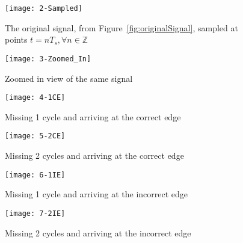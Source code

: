 \begin{figure}[ht]
\texttt{[image: 2-Sampled]}
\caption{\label{fig:sampled}The original signal, from Figure~\ref{fig:originalSignal}, sampled at points $t=nT_s , \forall n\in\mathbb{Z}$}
\end{figure}

\begin{figure}[ht]
\texttt{[image: 3-Zoomed\_In]}
\caption{\label{fig:zoom}Zoomed in view of the same signal}
\end{figure}

\begin{figure}[ht]
\texttt{[image: 4-1CE]}
\caption{\label{fig:1CE}Missing 1 cycle and arriving at the correct edge}
\end{figure}

\begin{figure}[ht]
\texttt{[image: 5-2CE]}
\caption{\label{fig:2CE}Missing 2 cycles and arriving at the correct edge}
\end{figure}

\begin{figure}[ht]
\texttt{[image: 6-1IE]}
\caption{\label{fig:1IE}Missing 1 cycle and arriving at the incorrect edge}
\end{figure}

\begin{figure}[ht]
\texttt{[image: 7-2IE]}
\caption{\label{fig:2IE}Missing 2 cycles and arriving at the incorrect edge}
\end{figure}


